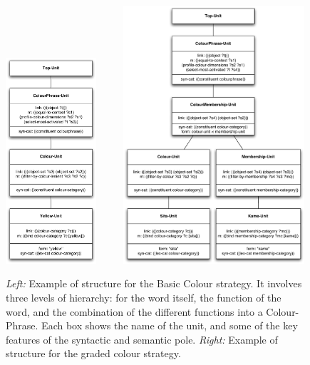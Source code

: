 \begin{figure}[htbp]
  \centerline{\includegraphics[width=0.3\textwidth]{chap11/figs/syntactic-basic.pdf} ~~~~ 
\includegraphics[width=0.6\textwidth]{chap11/figs/syntactic-graded.pdf}}
\caption{\label{fig:syntactic-graded} 
{\itshape Left:} Example of structure for the Basic Colour strategy. It involves three levels of hierarchy: for the word 
itself, the function of the word, and the combination of the different functions into a Colour-Phrase. Each box 
shows the name of the unit, and some of the key features of the syntactic and semantic pole.
{\itshape Right:} Example of structure for the graded colour strategy.}
\end{figure}


